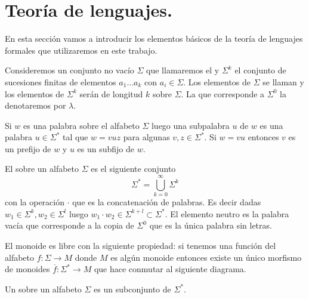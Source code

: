 \documentclass[tesis.tex]{subfiles}
\begin{document}
\chapter{Teoría de lenguajes.}	
En esta sección vamos a introducir los elementos básicos de la teoría de lenguajes formales que utilizaremos en este trabajo. 

Consideremos un conjunto no vacío $\Sigma$ que llamaremos el  y $\Sigma^k$ el conjunto de sucesiones finitas de elementos $a_1 \dots a_k$ con  $a_i \in \Sigma$. Los elementos de $\Sigma$ se llaman  y los elementos de $\Sigma^k$ serán  de longitud $k$ sobre $\Sigma$. La  que corresponde a $\Sigma^0$ la denotaremos por $\lambda$.


Si $w$ es una palabra sobre el alfabeto $\Sigma$ luego una subpalabra $u$ de $w$ es una palabra $u \in \Sigma^*$ tal que $w = vuz$ para algunas $v, z \in \Sigma^*$. Si $w = vu$ entonces $v$ es un prefijo de $w$ y $u$ es un subfijo de $w$.
\begin{deff}
	El  sobre un alfabeto $\Sigma$ es el siguiente conjunto
	\begin{equation*}
	\Sigma^{*} = \bigcup_{k=0}^{\infty} \Sigma^k
	\end{equation*}
	con la operación $\cdot$ que es la concatenación de palabras. Es decir dadas $w_1 \in \Sigma^{k}, w_2 \in \Sigma^{l}$ luego $w_1 \cdot w_2 \in \Sigma^{k+l} \subset \Sigma^*$. El elemento neutro es la palabra vacía que corresponde a la copia de $\Sigma^0$ que es la única palabra sin letras. 
\end{deff}
\begin{obs}
	El monoide es libre con la siguiente propiedad: si tenemos una función del alfabeto $f: \Sigma \to M$ donde $M$ es algún monoide entonces existe un único morfismo de monoides $\overline f: \Sigma^{*} \to M$ que hace conmutar al siguiente diagrama.	
	
	\begin{center}
	\end{center}
	
\end{obs}


\begin{deff}
	Un  sobre un alfabeto $\Sigma$ es un subconjunto de $\Sigma^*$.
\end{deff}
\end{document}
